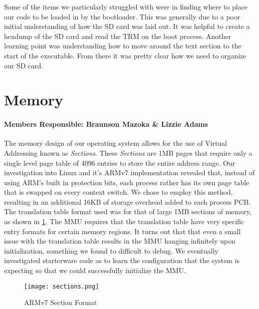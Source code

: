 \documentclass[12pt]{article}
\begin{document}
Some of the items we particularly struggled with were in finding where to
place our code to be loaded in by the bootloader. This was generally due to
a poor initial understanding of how the SD card was laid out. It was helpful to
create a hexdump of the SD card and read the TRM on the boot process. Another
learning point was understanding how to move around the text section to the start
of the executable.
From there it was pretty clear how we need to organize our SD card.

\section{Memory}\label{memory}
\paragraph{Members Responsible: Braunson Mazoka \& Lizzie Adams}

The memory design of our operating system allows for the use of Virtual
Addressing known as \textit{Sections}. These \textit{Sections} are 1MB
pages that require only a single level page table of 4096 entries to store
the entire address range. Our investigation into Linux and it's ARMv7
implementation revealed that, instead of using ARM's built in protection
bits, each process rather has its own page table that is swapped on every
context switch. We chose to employ this method, resulting in an additional
16KB of storage overhead added to each process PCB. The translation table
format used was for that of large 1MB sections of memory, as shown in
\ref{fig:fig_section}. The MMU requires that the translation table have very
specific entry formats for certain memory regions. It turns out that that
even a small issue with the translation table results in the MMU hanging
infinitely upon initialization, something we found to difficult to debug.
We eventually investigated starterware code as to learn the configuration
that the system is expecting so that we could successfully initialize the
MMU.

\begin{figure}[!htbp]
	\centering
	\texttt{[image: sections.png]}
	\caption{ARMv7 Section Format}
	\label{fig:fig_section}
\end{figure}
\end{document}
